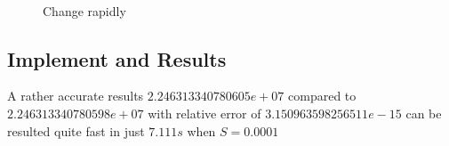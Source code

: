 \documentclass[
10pt, %
a4paper, %
oneside, %
headinclude,footinclude, %
BCOR5mm, %
]{scrartcl}
\theoremstyle{definition}
\begin{document}
\begin{figure}[tb]
\centering
{} \quad
{} \\

\caption[Change rapidly]{Change rapidly} %
\end{figure}

\subsection{Implement and Results}
A rather accurate results $2.246313340780605e+07
$ compared to $ 2.246313340780598e+07$ with relative error of $ 3.150963598256511e-15$ can be resulted quite fast in just $7.111s$ when $S=0.0001$

\end{document}
